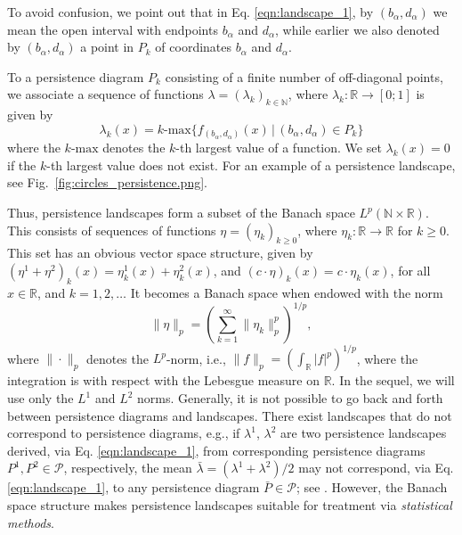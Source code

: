 \documentclass[preprint,12pt]{elsarticle}
\theoremstyle{definition}
\theoremstyle{remark}
\numberwithin{equation}{section}
\theoremstyle{definition}
\def\N{{\mathbb N}}
\def\R{{\mathbb R}}
\begin{document}
To avoid confusion, we point out that in  Eq. \eqref{eqn:landscape_1}, by $(b_\alpha,d_\alpha)$ we mean the open interval with endpoints $b_\alpha$ and $d_\alpha$, while earlier we also denoted by $(b_\alpha,d_\alpha)$ a point in $P_k$ of coordinates $b_\alpha$ and $d_\alpha$.

To a persistence diagram $P_k$ consisting of a finite number of off-diagonal points, we associate
a sequence of functions $\lambda=(\lambda_k)_{k\in\mathbb{N}}$, where $\lambda_k:\mathbb{R}\to[0;1]$ is given by
\begin{equation}\label{eqn:landscape_2} \lambda_k(x)=k\textrm{-max}\{f_{(b_\alpha,d_\alpha)}(x)\,|\, (b_\alpha,d_\alpha)\in P_k\}
\end{equation}
where the $k\textrm{-max}$ denotes the $k$-th largest value of a  function.
We set $\lambda_k(x) = 0$ if
the $k$-th largest value does not exist. For an example of a persistence landscape, see Fig.~\ref{fig:circles_persistence.png}.


Thus, persistence landscapes form a subset of the Banach space $L^p(\N\times \R)$. This consists of sequences of functions $\eta =(\eta_k)_{k\geq 0}$, where $\eta_k:\R\to\R$ for $k\geq 0$. This set  has an obvious vector space structure, given by $(\eta^1+\eta^2)_k(x)=\eta^1_k(x)+\eta^2_k(x)$, and $(c\cdot\eta)_k(x)=c\cdot\eta_k(x)$, for all $x\in\mathbb{R}$, and $k=1,2,\ldots$ It  becomes a Banach  space when endowed with the norm
\begin{equation}\label{eqn:landscape_3}\|\eta\|_p=\left (\sum_{k=1}^{\infty}\|\eta_k\|_p^p\right)^{1/p},\end{equation}
where $\|\cdot\|_p$ denotes the $L^p$-norm, i.e., $\|f\|_p=\left ( \int _\mathbb{R} |f|^p\right )^{1/p}$, where the integration is with respect with  the Lebesgue measure on $\R$.
In the sequel, we will use only the $L^1$ and $L^2$ norms.
Generally, it is not possible to go back and forth between persistence diagrams and landscapes. There exist landscapes that do not correspond to persistence diagrams, e.g., if $\lambda^1$, $\lambda^2$ are two persistence landscapes derived, via Eq. \eqref{eqn:landscape_1}, from corresponding  persistence diagrams $P^1,P^2\in\mathscr{P}$, respectively,  the mean $\bar\lambda=(\lambda^1+\lambda^2)/2$ may not correspond, via  Eq. \eqref{eqn:landscape_1}, to any persistence diagram $\bar P\in\mathscr{P}$; see \cite{Bubenik15}.
However, the Banach space structure makes persistence landscapes suitable for treatment via \emph{statistical
methods}.
\end{document}
